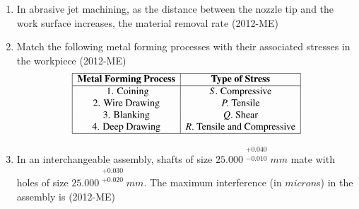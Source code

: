 \documentclass[journal,12pt,twocolumn]{IEEEtran}
\theoremstyle{remark}
\begin{document}
 \begin{enumerate}
		 
	 \item In abrasive jet machining, as the distance between the nozzle tip and the work surface increases, the material removal rate \hfill{(2012-ME)}
	 
\begin{enumerate}
\end{enumerate}


\item Match the following metal forming processes with their associated stresses in the workpiece \hfill{(2012-ME)}
\[
\begin{array}{|c|c|c|}
\hline
\text{\textbf{Metal Forming Process}} & \text{\textbf{Type of Stress}} \\
\hline
 \text{ 1.   Coining} & S. \  \text{Compressive} \\
  \text{2.   Wire Drawing} & P.  \ \text{Tensile} \\
 \text{3.   Blanking} & Q. \   \text{Shear} \\
 \text{4.   Deep Drawing} & R. \  \text{Tensile and Compressive} \\
\hline
\end{array}
\]


	\begin{enumerate}
\end{enumerate}

\item In an interchangeable assembly, shafts of size ${25.000}^{\begin{matrix} +0.040 \\ -0.010 \end{matrix}} mm$ mate with holes of size ${25.000}^{\begin{matrix}    +0.030 \\ +0.020 \end{matrix}} mm$. The maximum interference (in $micron$s) in the assembly is \hfill{(2012-ME)} 
                 \begin{enumerate}   
\end{enumerate}
\end{enumerate}
\end{document}
